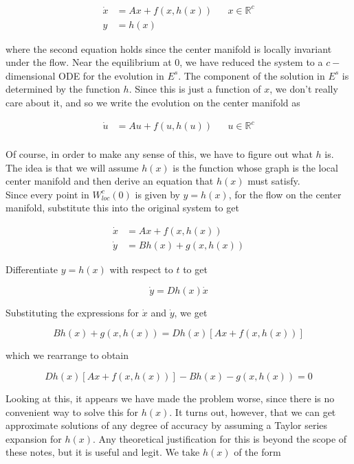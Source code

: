 \documentclass{article}
\def\R{{\mathbb R}}
\begin{document}
\begin{align}
\dot{x} &= Ax + f(x, h(x)) && x \in \R^c \\
y &= h(x)
\end{align}

where the second equation holds since the center manifold is locally invariant under the flow.
Near the equilibrium at 0, we have reduced the system to a $c-$dimensional ODE for the evolution in $E^s$. The component of the solution in $E^s$ is determined by the function $h$. Since this is just a function of $x$, we don't really care about it, and so we write the evolution on the center manifold as

\begin{align}
\dot{u} &= Au + f(u, h(u)) && u \in \R^c \\
\end{align}

Of course, in order to make any sense of this, we have to figure out what $h$ is. The idea is that we will assume $h(x)$ is the function whose graph is the local center manifold and then derive an equation that $h(x)$ must satisfy.\\

Since every point in $W^c_{loc}(0)$ is given by $y = h(x)$, for the flow on the center manifold, substitute this into the original system to get

\begin{align} 
\dot{x} &= Ax + f(x, h(x)) \\
\dot{y} &= Bh(x) + g(x, h(x))
\end{align}

Differentiate $y = h(x)$ with respect to $t$ to get

\[
\dot{y} = Dh(x) \dot{x}
\]

Substituting the expressions for $\dot{x}$ and $\dot{y}$, we get


\[
Bh(x) + g(x, h(x)) = Dh(x) [ Ax + f(x, h(x))]
\]

which we rearrange to obtain

\begin{equation}\label{heq}
Dh(x) [ Ax + f(x, h(x))] - Bh(x) - g(x, h(x)) = 0
\end{equation}

Looking at this, it appears we have made the problem worse, since there is no convenient way to solve this for $h(x)$. It turns out, however, that we can get approximate solutions of any degree of accuracy by assuming a Taylor series expansion for $h(x)$. Any theoretical justification for this is beyond the scope of these notes, but it is useful and legit. We take $h(x)$ of the form
\end{document}
